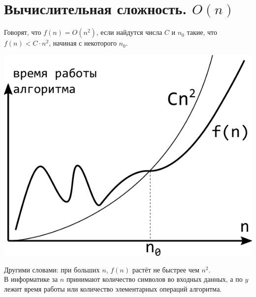 \documentclass{article}
\begin{document}
\section*{Вычислительная сложность. $O(n)$}
Говорят, что $f(n) = O(n^2)$, если найдутся числа $C$ и $n_0$ такие, что $f(n) < C \cdot n^2$, начиная с  некоторого $n_0$.
\begin{center}
\includegraphics[scale=0.5]{../images/On.png}
\end{center}
Другими словами: при больших $n$, $f(n)$ растёт не быстрее чем $n^2$.\\
В информатике за $n$ принимают количество символов во входных данных, а по $y$ лежит время работы или количество элементарных операций алгоритма.
\end{document}
